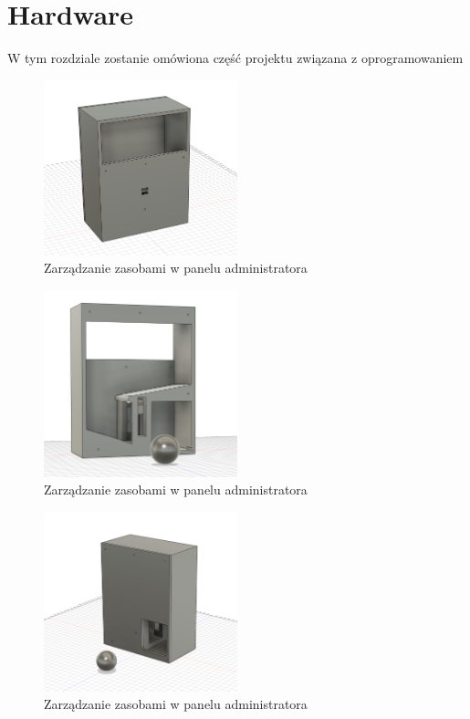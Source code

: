 \chapter{Hardware}
\label{ch:funplenop}
W tym rozdziale zostanie omówiona część projektu związana z oprogramowaniem

\lipsum[1]

\begin{figure}[h!]
  \centering
    \includegraphics[width=0.5\textwidth]{images/3D/gate_front.png}
  \caption{Zarządzanie zasobami w panelu administratora}
  \label{fig:mobile}
\end{figure}

\begin{figure}[h!]
  \centering
    \includegraphics[width=0.5\textwidth]{images/3D/gate_inside.png}
  \caption{Zarządzanie zasobami w panelu administratora}
  \label{fig:mobile}
\end{figure}

\begin{figure}[h!]
  \centering
    \includegraphics[width=0.5\textwidth]{images/3D/gate_with_back.png}
  \caption{Zarządzanie zasobami w panelu administratora}
  \label{fig:mobile}
\end{figure}

